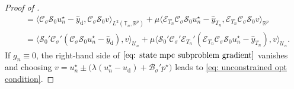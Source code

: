 \documentclass[reqno]{amsart}
\newcommand{\U}{{\mathscr U}}
\newcommand{\R}{\mathbb R}
\newcommand{\timeInt}{\mathbb{T}}
\newcommand{\adState}{p}
\newcommand{\desired}[1]{#1_{\mathrm{d}}}
\newcommand{\inpVar}{u}
\newcommand{\inpVarDes}{\desired{u}}
\newcommand{\outVar}{y}
\newcommand{\hatoutVarDes}{\desired{\hat y}}
\newcommand{\outVarDim}{p}
\newcommand{\dt}{\,\mathrm{d}t}
\newcommand{\bOper}{\calB}
\newcommand{\cOper}{\calC}
\newcommand{\solOper}{\calS_{0}}
\newcommand{\optAdState}{\adState^\star}
\newcommand{\optInpVar}[1]{\inpVar_{#1}^\star}
\newcommand{\optInpVarN}{\optInpVar{n}}
\newcommand{\switch}{\sigma}
\newcommand{\calB}{\mathcal{B}}
\newcommand{\calC}{\mathcal{C}}
\newcommand{\calE}{\mathcal{E}}
\newcommand{\calS}{\mathcal{S}}
\begin{document}
\begin{proof}[Proof of ]
\begin{align*}
     &=  \langle \cOper_{\switch}\solOper \optInpVarN - \hatoutVarDes, \cOper_{\switch}\solOper v\rangle_{L^2(\timeInt_n, \R^p)}  + \mu \langle \calE_{T_n}\cOper_{\switch}\solOper\optInpVarN- \hat{\outVar}_{T_n},\calE_{T_n}\cOper_{\switch}\solOper v\rangle_{\R^{\outVarDim}}\\
     &=  \langle \solOper'\cOper_{\switch}'(\cOper_{\switch}\solOper\optInpVarN - \hatoutVarDes), v \rangle_{\U_n}  + {\mu}\langle\solOper'\cOper_{\switch}' \calE_{T_n}'(\calE_{T_n}\cOper_{\switch}\solOper\optInpVarN- \hat{\outVar}_{T_n}),  v\rangle_{\U_n}.
     \end{align*}
     If $g_n\equiv 0$, the right-hand side of $\eqref{eq: state mpc subproblem gradient}$ vanishes and choosing $v= \optInpVarN \pm \big(\lambda (\optInpVarN-\inpVarDes)  +\bOper_{\switch}' \optAdState\big) $ leads to \eqref{eq: unconstrained opt condition}.
\end{proof}
%
\end{document}
